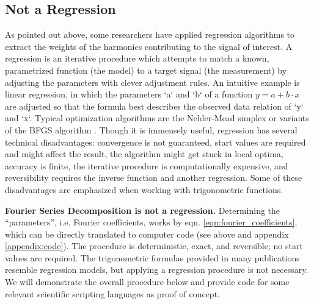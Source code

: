 \documentclass[10pt,a4paper]{article}
\begin{document}
\subsection{Not a Regression}
\label{sec:org3a08ae8}
As pointed out above, some researchers have applied regression algorithms to extract the weights of the harmonics contributing to the signal of interest.
A regression is an iterative procedure which attempts to match a known, parametrized function (the model) to a target signal (the measurement) by adjusting the parameters with clever adjustment rules.
An intuitive example is linear regression, in which the parameters `a` and `b` of a function \(y=a+b\cdot x\) are adjusted so that the formula best describes the observed data relation of `y` and `x`.
Typical optimization algorithms are the Nelder-Mead simplex \citep{Nelder1965} or variants of the BFGS algorithm \citep{Broyden1970,Fletcher1970,Goldfrab1970,Shanno1970,Zhu1997}.
Though it is immensely useful, regression has several technical disadvantages: convergence is not guaranteed, start values are required and might affect the result, the algorithm might get stuck in local optima, accuracy is finite, the iterative procedure is computationally expensive, and reversibility requires the inverse function and another regression.
Some of these disadvantages are emphasized when working with trigonometric functions.


\textbf{Fourier Series Decomposition is not a regression.}
Determining the ``parameters'', i.e. Fourier coefficients, works by eqn. \eqref{eqn:fourier_coefficients}, which can be directly translated to computer code (see above and appendix \ref{appendix:code}).
The procedure is deterministic, exact, and reversible; no start values are required.
The trigonometric formulas provided in many publications resemble regression models, but applying a regression procedure is not necessary.
We will demonstrate the overall procedure below and provide code for some relevant scientific scripting languages as proof of concept.
\end{document}

